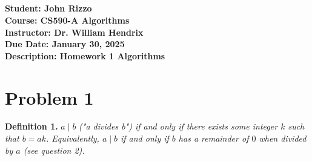 \documentclass[12pt, letterpaper]{article}
\title{\classname \\ \assignmentdescription}
\author{\studentname}
\date{\duedate}
\newcommand{\studentname}          {John Rizzo           }
\newcommand{\classname}            {CS590-A Algorithms   }
\newcommand{\professorname}        {Dr. William Hendrix  }
\newcommand{\assignmentdescription}{Homework 1 Algorithms}
\newcommand{\duedate}              {January 30, 2025     }
\begin{document}
\noindent
\normalsize \textbf{Student:     \studentname} \\ [5pt]
            \textbf{Course:      \classname} \\ [5pt]
            \textbf{Instructor:  \professorname} \\ [5pt]
            \textbf{Due Date:    \duedate} \\ [5pt]
            \textbf{Description: \assignmentdescription}

\vspace{0.5cm}

\section*{Problem 1}
\textbf{Definition 1.} $a \mid b$ \textit{("a divides b") if and only if there exists some integer $k$ such that $b = ak$. Equivalently, $a \mid b$ if and only if $b$ has a remainder of $0$ when divided by $a$ (see question 2).}
\end{document}
